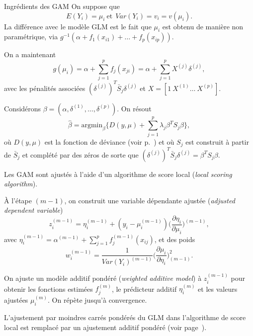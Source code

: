\documentclass{BeamerTemplate}
\begin{document}
\begin{refsection}
\begin{frame}{Ingrédients des GAM}
\bigskip
On suppose que
$$E(Y_i) = \mu_i \ \mbox{et} \ \ Var(Y_i) = v_i = v(\mu_i).$$
La différence avec le modèle GLM est le fait que $\mu_i$ est obtenu
de manière non paramétrique, via $g^{-1}(\alpha + f_1(x_{i1}) + \ldots + f_p(x_{ip}))$.
\end{frame}

\begin{frame}{}
On a maintenant
$$g(\mu_i ) =  \alpha+ \sum_{j=1}^p f_j(x_{ji}) = \alpha+ \sum_{j=1}^p X^{(j)} \delta^{(j)},$$
avec les pénalités associées $(\delta^{(j)})^T \bar{S}_j \delta^{(j)}$ et $X
= [1 \  X^{(1)}  \ldots  \ X^{(p)} ]$. 

\bigskip 
Considérons $\beta = (\alpha, \delta^{(1)}, \ldots, \delta^{(p)})$. On résout
 $$\hat{\beta} = \mbox{argmin}_{\beta} \{  D(y,\mu)+ \sum_{j=1}^{p} \lambda_j  \beta^T S_j \beta \},$$
où $D(y,\mu)$ est la fonction de déviance (voir p.~\pageref{deviance.def}) et où $S_j$ est construit à partir de $\bar{S}_j$ et complété par des zéros de sorte que
$(\delta^{(j)})^T \bar{S}_j \delta^{(j)} = \beta^T S_j \beta$.
\end{frame}

\begin{frame}{}
Les GAM sont ajustés à l'aide d'un {\color{blue}algorithme de score local} (\textit{local scoring algorithm}).

\bigskip
À l'étape $(m-1)$, on construit une {\color{blue}variable dépendante ajustée} (\textit{adjusted dependent variable})
$$z_i^{(m-1)} = \eta_i^{(m-1)} + (y_i - \mu_i^{(m-1)}) \Big(\frac{\partial \eta_i}{\partial \mu_i} \Big)^{(m-1)},$$
avec $\eta_i^{(m-1)} = \alpha^{(m-1)} + \sum_{j=1}^p f_j^{(m-1)}(x_{ij})$, et des poids
$$w_i^{(m-1)} = \frac{1}{Var(Y_i)^{(m-1)}}\Big(\frac{\partial \mu_i}{\partial \eta_i} \Big)_{(m-1)}^2.$$

On ajuste un {\color{blue}modèle additif pondéré} (\textit{weighted additive model}) à $z_i^{(m-1)}$ pour obtenir les fonctions estimées $f_j^{(m)}$, le prédicteur additif $\eta_i^{(m)}$ et les valeurs ajustées $\mu_i^{(m)}$. On répète jusqu'à convergence.


\bigskip
L'ajustement par moindres carrés pondérés du GLM dans l'algorithme de score local
est remplacé par un ajustement additif pondéré (voir page~\pageref{IWLSweights}).

\end{frame}



\end{refsection}
\end{document}
